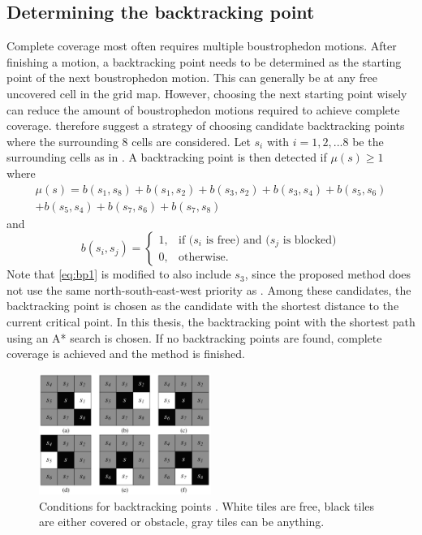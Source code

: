 \subsection{Determining the backtracking point}

Complete coverage most often requires multiple boustrophedon motions. After finishing a motion, a backtracking point needs to be determined as the starting point of the next boustrophedon motion. This can generally be at any free uncovered cell in the grid map. However, choosing the next starting point wisely can reduce the amount of boustrophedon motions required to achieve complete coverage. \citet{Viet2013} therefore suggest a strategy of choosing candidate backtracking points where the surrounding 8 cells are considered. Let $s_i$ with $i=1,2,...8$ be the surrounding cells as in . A backtracking point is then detected if $\mu (s) \geq 1$ where
\begin{multline} \label{eq:bp1}
\mu (s) = b(s_1,s_8)+b(s_1,s_2)+b(s_3,s_2)+b(s_3,s_4)+b(s_5,s_6) \\ 
+b(s_5,s_4)+b(s_7,s_6)+b(s_7,s_8)
\end{multline}
and
\begin{equation} \label{eq:bp2}
b(s_i,s_j) = 
\begin{cases}
1, & \text{if ($s_i$ is free) and ($s_j$ is blocked)} \\
0, & \text{otherwise.}
\end{cases}
\end{equation}
Note that \eqref{eq:bp1} is modified to also include $s_3$, since the proposed method does not use the same north-south-east-west priority as \citet{Viet2013}. Among these candidates, the backtracking point is chosen as the candidate with the shortest distance to the current critical point. In this thesis, the backtracking point with the shortest path using an A* search is chosen. If no backtracking points are found, complete coverage is achieved and the method is finished. 

\begin{figure}[h!]
	\centering
	\includegraphics[width=0.5\textwidth]{fig/ccpp/bps}
	\caption[Conditions for backtracking points.]{Conditions for backtracking points \citep{Viet2013}. White tiles are free, black tiles are either covered or obstacle, gray tiles can be anything.}
	\label{fig:bps}
\end{figure}

